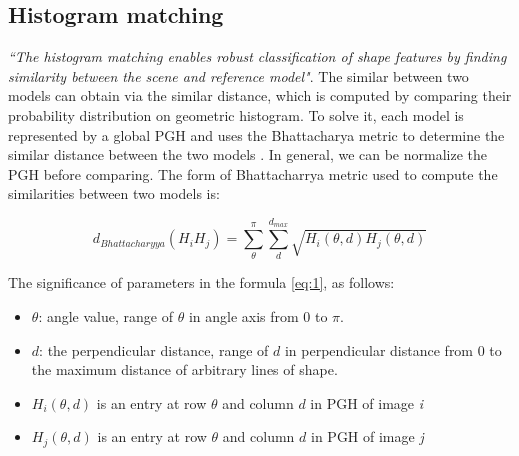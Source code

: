 \subsection{Histogram matching}
\textit{``The histogram matching enables robust classification of shape features by finding similarity between the scene and reference model"}\cite{palaniswamy2010automatic}. The similar between two models can obtain via the similar distance, which is computed by comparing their probability distribution on geometric histogram. To solve it, each model is represented by a global PGH and uses the Bhattacharya\cite{thacker1995assessing} metric to determine the similar distance between the two models \cite{palaniswamy2010automatic}. In general, we can be normalize the PGH before comparing. The form of Bhattacharrya metric used to compute the similarities between two models is:
\begin{center}
\begin{equation} \label{eq:1}
d_{Bhattacharyya} (H_{i}H_{j}) = \sum\limits_{\theta}^{\pi}\sum\limits_{d}^{d_{max}}\sqrt{H_{i}(\theta,d)H_{j}(\theta,d)}
\end{equation}
\end{center}
The significance of parameters in the formula \ref{eq:1}, as follows:
\begin{itemize}
\item $\theta$: angle value, range of $\theta$ in angle axis from 0 to $\pi$.
\item $d$: the perpendicular distance, range of $d$ in perpendicular distance from 0 to the maximum distance of arbitrary lines of shape.
\item $H_{i}(\theta,d)$ is an entry at row $\theta$ and column $d$ in PGH of image \textit{i}
\item $H_{j}(\theta,d)$ is an entry at row $\theta$ and column $d$ in PGH of image \textit{j}
\end{itemize}
